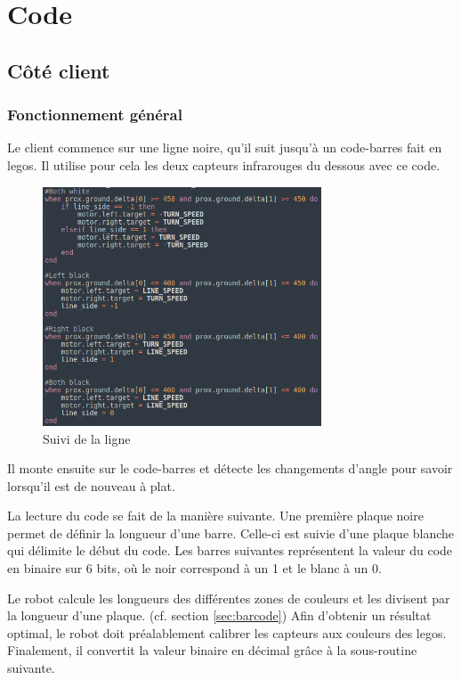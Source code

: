 \chapter{Code}
\section{Côté client}
\subsection{Fonctionnement général}
\label{sec:general}
Le client commence sur une ligne noire, qu'il suit jusqu'à un code-barres fait en legos. Il utilise pour cela les deux capteurs infrarouges du dessous avec ce code.
\begin{figure}[H]
  \centering
  \includegraphics[height=7.1cm]{code/client_line_following}
  \caption{Suivi de la ligne}
  \label{fig:client_line_following}
\end{figure}

Il monte ensuite sur le code-barres et détecte les changements d'angle pour savoir lorsqu'il est de nouveau à plat.

La lecture du code se fait de la manière suivante.
Une première plaque noire permet de définir la longueur d'une barre.
Celle-ci est suivie d'une plaque blanche qui délimite le début du code.
Les barres suivantes représentent la valeur du code en binaire sur 6 bits, où le noir correspond à un 1 et le blanc à un 0.

Le robot calcule les longueurs des différentes zones de couleurs et les divisent par la longueur d'une plaque. (cf. section \ref{sec:barcode})
Afin d'obtenir un résultat optimal, le robot doit préalablement calibrer les capteurs aux couleurs des legos.
Finalement, il convertit la valeur binaire en décimal grâce à la sous-routine suivante.

